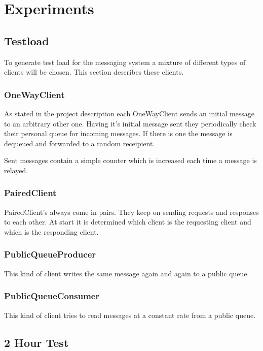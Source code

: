 \documentclass[milestone1.tex]{subfiles}
\begin{document}
\section{Experiments}

\subsection{Testload}
To generate test load for the messaging system a mixture of different types of clients will be chosen. This section describes these clients.

\subsubsection{OneWayClient}
As stated in the project description each OneWayClient sends an initial message to an arbitrary other one. Having it's initial message sent they periodically check their personal queue for incoming messages. If there is one the message is dequeued and forwarded to a random receipient.

Sent messages contain a simple counter which is increased each time a message is relayed.

\subsubsection{PairedClient}
PairedClient's always come in pairs. They keep on sending requests and responses to each other. At start it is determined which client is the requesting client and which is the responding client.

\subsubsection{PublicQueueProducer}
This kind of client writes the same message again and again to a public queue.

\subsubsection{PublicQueueConsumer}
This kind of client tries to read messages at a constant rate from a public queue.

\subsection{2 Hour Test}
\end{document}
